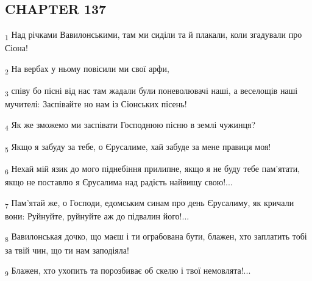 \subsection{CHAPTER 137}
\begin{tcolorbox}
\textsubscript{1} Над річками Вавилонськими, там ми сиділи та й плакали, коли згадували про Сіона!
\end{tcolorbox}
\begin{tcolorbox}
\textsubscript{2} На вербах у ньому повісили ми свої арфи,
\end{tcolorbox}
\begin{tcolorbox}
\textsubscript{3} співу бо пісні від нас там жадали були поневолювачі наші, а веселощів наші мучителі: Заспівайте но нам із Сіонських пісень!
\end{tcolorbox}
\begin{tcolorbox}
\textsubscript{4} Як же зможемо ми заспівати Господнюю пісню в землі чужинця?
\end{tcolorbox}
\begin{tcolorbox}
\textsubscript{5} Якщо я забуду за тебе, о Єрусалиме, хай забуде за мене правиця моя!
\end{tcolorbox}
\begin{tcolorbox}
\textsubscript{6} Нехай мій язик до мого піднебіння прилипне, якщо я не буду тебе пам'ятати, якщо не поставлю я Єрусалима над радість найвищу свою!...
\end{tcolorbox}
\begin{tcolorbox}
\textsubscript{7} Пам'ятай же, о Господи, едомським синам про день Єрусалиму, як кричали вони: Руйнуйте, руйнуйте аж до підвалин його!...
\end{tcolorbox}
\begin{tcolorbox}
\textsubscript{8} Вавилонськая дочко, що маєш і ти ограбована бути, блажен, хто заплатить тобі за твій чин, що ти нам заподіяла!
\end{tcolorbox}
\begin{tcolorbox}
\textsubscript{9} Блажен, хто ухопить та порозбиває об скелю і твої немовлята!...
\end{tcolorbox}
